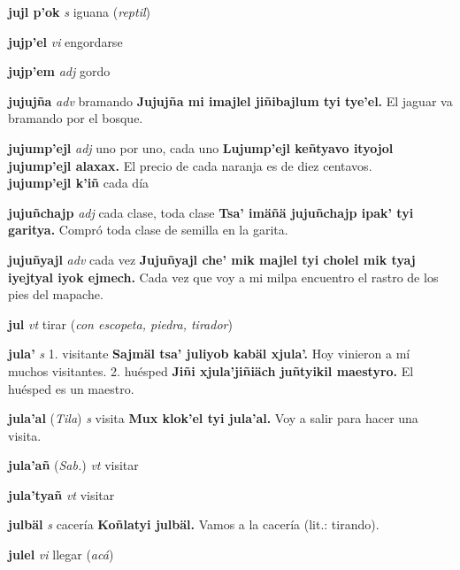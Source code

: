 \documentclass[10pt]{scrbook}
\newcommand{\entry}[1]{\textbf{#1}}
\newcommand{\onedefinition}[1]{#1.}
\newcommand{\partofspeech}[1]{\textit{#1}}
\newcommand{\spanishtranslation}[1]{#1}
\newcommand{\clarification}[1]{(\textit{#1})}
\newcommand{\cholexample}[1]{\textbf{#1}}
\newcommand{\exampletranslation}[1]{#1}
\newcommand{\relevantdialect}[1]{(\textit{#1})}
\newcommand{\secondaryentry}[1]{\\\textbf{#1}}
\newcommand{\secondtranslation}[1]{#1}
\begin{document}
\begin{multicols}{2}
\entry{jujl p'ok}
\partofspeech{s}
\spanishtranslation{iguana}
\clarification{reptil}

\entry{jujp'el}
\partofspeech{vi}
\spanishtranslation{engordarse}

\entry{jujp'em}
\partofspeech{adj}
\spanishtranslation{gordo}

\entry{jujujña}
\partofspeech{adv}
\spanishtranslation{bramando}
\cholexample{Jujujña mi imajlel jiñibajlum tyi tye'el.}
\exampletranslation{El jaguar va bramando por el bosque.}

\entry{jujump'ejl}
\partofspeech{adj}
\spanishtranslation{uno por uno, cada uno}
\cholexample{Lujump'ejl keñtyavo ityojol jujump'ejl alaxax.}
\exampletranslation{El precio de cada naranja es de diez centavos.}
\secondaryentry{jujump'ejl k'iñ}
\secondtranslation{cada día}

\entry{jujuñchajp}
\partofspeech{adj}
\spanishtranslation{cada clase, toda clase}
\cholexample{Tsa' imäñä jujuñchajp ipak' tyi garitya.}
\exampletranslation{Compró toda clase de semilla en la garita.}

\entry{jujuñyajl}
\partofspeech{adv}
\spanishtranslation{cada vez}
\cholexample{Jujuñyajl che' mik majlel tyi cholel mik tyaj iyejtyal iyok ejmech.}
\exampletranslation{Cada vez que voy a mi milpa encuentro el rastro de los pies del mapache.}

\entry{jul}
\partofspeech{vt}
\spanishtranslation{tirar}
\clarification{con escopeta, piedra, tirador}

\entry{jula'}
\partofspeech{s}
\onedefinition{1}
\spanishtranslation{visitante}
\cholexample{Sajmäl tsa' juliyob kabäl xjula'.}
\exampletranslation{Hoy vinieron a mí muchos visitantes.}
\onedefinition{2}
\spanishtranslation{huésped}
\cholexample{Jiñi xjula'jiñiäch juñtyikil maestyro.}
\exampletranslation{El huésped es un maestro.}

\entry{jula'al}
\relevantdialect{Tila}
\partofspeech{s}
\spanishtranslation{visita}
\cholexample{Mux klok'el tyi jula'al.}
\exampletranslation{Voy a salir para hacer una visita.}

\entry{jula'añ}
\relevantdialect{Sab.}
\partofspeech{vt}
\spanishtranslation{visitar}

\entry{jula'tyañ}
\partofspeech{vt}
\spanishtranslation{visitar}

\entry{julbäl}
\partofspeech{s}
\spanishtranslation{cacería}
\cholexample{Koñlatyi julbäl.}
\exampletranslation{Vamos a la cacería (lit.: tirando).}

\entry{julel}
\partofspeech{vi}
\spanishtranslation{llegar}
\clarification{acá}


\end{multicols}
\end{document}
